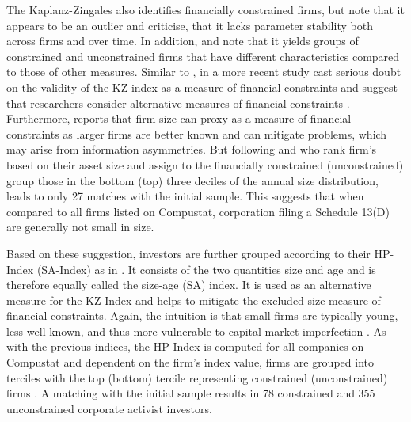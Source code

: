 \documentclass[12pt]{article}
\begin{document}
The Kaplanz-Zingales also identifies financially constrained firms, but \citet[p.279]{Farre-Mensa2016} note that it appears to be an outlier and \citet[p.533]{Whited2006} criticise, that it lacks parameter stability both across firms and over time. In addition, \citet[p.111]{Khatami2014} and \citet[p.1779]{Almeida2004} note that it yields groups of constrained and unconstrained firms that have different characteristics compared to those of other measures. Similar to \citet[p.546]{Whited2006}, in a more recent study \citet[p.1909]{hadlock2010} cast serious doubt on the validity of the KZ-index as a measure of financial constraints and suggest that researchers consider alternative measures of financial constraints \citep[p.1938]{hadlock2010}. Furthermore, \citet[p.15]{heller2015} reports that firm size can proxy as a measure of financial constraints as larger firms are better known and can mitigate problems, which may arise from information asymmetries. But following \citet[p.1790]{Almeida2004} and \citet[p.215]{Moeller2004} who rank firm's based on their asset size and assign to the financially constrained (unconstrained) group those in the bottom (top) three deciles of the annual size distribution, leads to only 27 matches with the initial sample. This suggests that when compared to all firms listed on Compustat, corporation filing a Schedule 13(D) are generally not small in size.\par
Based on these suggestion, investors are further grouped according to their HP-Index (SA-Index) as in \citet[p.1929]{hadlock2010}. It consists of the two quantities size and age and is therefore equally called the size-age (SA) index. It is used as an alternative measure for the KZ-Index and helps to mitigate the excluded size measure of financial constraints. Again, the intuition is that small firms are typically young, less well known, and thus more vulnerable to capital market imperfection \citep[p.1790]{Almeida2004}. As with the previous indices, the HP-Index is computed for all companies on Compustat and dependent on the firm's index value, firms are grouped into terciles with the top (bottom) tercile representing constrained (unconstrained) firms \citep[p.306]{Farre-Mensa2016}. A matching with the initial sample results in 78 constrained and 355 unconstrained corporate activist investors.\par
\end{document}
